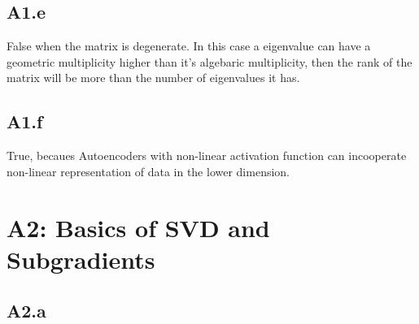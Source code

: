 \documentclass[]{article}
\begin{document}
    \subsection*{A1.e}
        False when the matrix is degenerate. In this case a eigenvalue can have a geometric multiplicity higher than it's algebaric multiplicity, then the rank of the matrix will be more than the number of eigenvalues it has. 
    \subsection*{A1.f}
        True, becaues Autoencoders with non-linear activation function can incooperate non-linear representation of data in the lower dimension. 
        
    
\section*{A2: Basics of SVD and Subgradients}
    \subsection*{A2.a}
\end{document}
